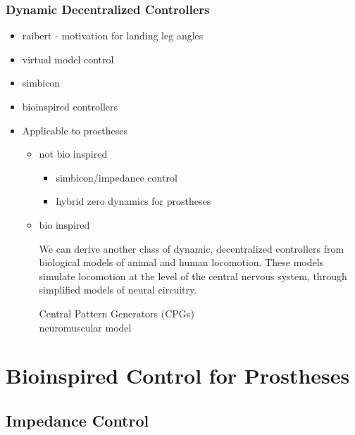 \subsubsection{Dynamic Decentralized Controllers}
    \begin{itemize}
        \item raibert - motivation for landing leg angles
        \item virtual model control
        \item simbicon
        \item bioinspired controllers

        \item Applicable to prostheses
        \begin{itemize}
            \item not bio inspired
                \begin{itemize}
                    \item simbicon/impedance control
                    \item hybrid zero dynamics for prostheses
                \end{itemize}

            \item bio inspired

                We can derive another class of dynamic, decentralized
                controllers from biological models of animal and human
                locomotion. These models simulate locomotion at the level of the
                central nervous system, through simplified models of neural
                circuitry. 
                \begin{description}
                    \item[Central Pattern Generators (CPGs)]
                        
                    \item[neuromuscular model] 
                \end{description}
        \end{itemize}
   \end{itemize}

\section{Bioinspired Control for Prostheses}
\subsection{Impedance Control}

